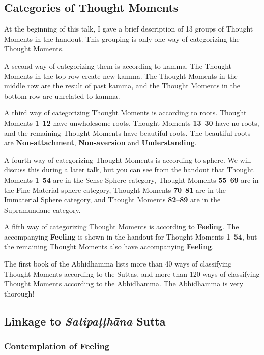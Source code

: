 \subsection*{Categories of Thought Moments}

At the beginning of this talk, I gave a brief description of 13 groups of Thought Moments in the handout. This grouping is only one way of categorizing the Thought Moments.

A second way of categorizing them is according to kamma. The Thought Moments in the top row create new kamma. The Thought Moments in the middle row are the result of past kamma, and the Thought Moments in the bottom row are unrelated to kamma.

A third way of categorizing Thought Moments is according to roots. Thought Moments \textbf{1}--\textbf{12} have unwholesome roots, Thought Moments \textbf{13}--\textbf{30} have no roots, and the remaining Thought Moments have beautiful roots. The beautiful roots are \textbf{Non-attachment}, \textbf{Non-aversion} and \textbf{Understanding}.

A fourth way of categorizing Thought Moments is according to sphere. We will discuss this during a later talk, but you can see from the handout that Thought Moments \textbf{1}--\textbf{54} are in the Sense Sphere category, Thought Moments \textbf{55}--\textbf{69} are in the Fine Material sphere category, Thought Moments \textbf{70}--\textbf{81} are in the Immaterial Sphere category, and Thought Moments \textbf{82}--\textbf{89} are in the Supramundane category.

A fifth way of categorizing Thought Moments is according to \textbf{Feeling}. The accompanying \textbf{Feeling} is shown in the handout for Thought Moments \textbf{1}--\textbf{54}, but the remaining Thought Moments also have accompanying \textbf{Feeling}.

The first book of the Abhidhamma lists more than 40 ways of classifying Thought Moments according to the Suttas, and more than 120 ways of classifying Thought Moments according to the Abhidhamma. The Abhidhamma is very thorough!

\subsection*{Linkage to \textit{Satipaṭṭhāna} Sutta}

\subsubsection*{Contemplation of \textbf{Feeling}}

